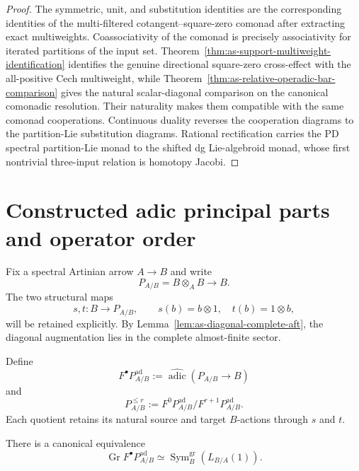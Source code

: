 \begin{proof}
The symmetric, unit, and substitution identities are the corresponding
identities of the multi-filtered cotangent--square-zero comonad after
extracting exact multiweights.  Coassociativity of the comonad is precisely
associativity for iterated partitions of the input set.
Theorem~\ref{thm:as-support-multiweight-identification} identifies the genuine
directional square-zero cross-effect with the all-positive Cech multiweight,
while Theorem~\ref{thm:as-relative-operadic-bar-comparison} gives the natural
scalar-diagonal comparison on the canonical comonadic resolution.  Their
naturality makes them compatible with the same comonad cooperations.
Continuous duality reverses the cooperation diagrams to the partition-Lie
substitution diagrams.  Rational rectification carries the PD spectral
partition-Lie monad to the shifted dg Lie-algebroid monad, whose first
nontrivial three-input relation is homotopy Jacobi.
\end{proof}

\section{Constructed adic principal parts and operator order}
\label{sec:as-adic-operators}

Fix a spectral Artinian arrow $A\to B$ and write
\[
    P_{A/B}=B\otimes_A B\longrightarrow B.
\]
The two structural maps
\[
    s,t:B\longrightarrow P_{A/B},
    \qquad
    s(b)=b\otimes1,
    \quad
    t(b)=1\otimes b,
\]
will be retained explicitly.  By
Lemma~\ref{lem:as-diagonal-complete-aft}, the diagonal augmentation lies in
the complete almost-finite sector.

\begin{definition}
\label{def:as-completed-principal-parts}
Define
\[
\boxed{
    F^\bullet P_{A/B}^{\mathrm{ad}}
    :=
    \widehat{\operatorname{adic}}
    (P_{A/B}\to B)
}
\]
and
\[
    P_{A/B}^{\le r}
    :=
    F^0P_{A/B}^{\mathrm{ad}}
    /
    F^{r+1}P_{A/B}^{\mathrm{ad}}.
\]
Each quotient retains its natural source and target $B$-actions through
$s$ and $t$.
\end{definition}

\begin{theorem}
\label{thm:as-principal-parts-associated-graded}
There is a canonical equivalence
\[
\boxed{
    \operatorname{Gr}
    F^\bullet P_{A/B}^{\mathrm{ad}}
    \simeq
    \operatorname{Sym}^{\mathrm{gr}}_B
    \left(
        L_{B/A}(1)
    \right).
}
\]
\end{theorem}


